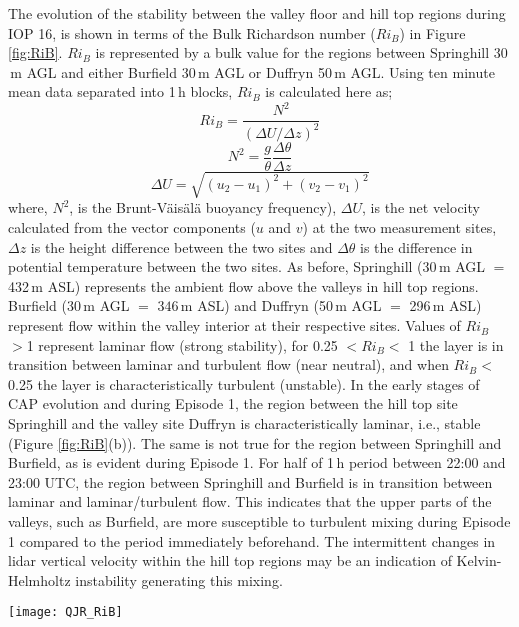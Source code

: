 \documentclass[times]{qjrms4}
\begin{document}
The evolution of the stability between the valley floor and hill top regions during IOP 16, is shown in terms of the Bulk Richardson number ($Ri_B$) in Figure \ref{fig:RiB}. $Ri_B$ is represented by a bulk value for the regions between Springhill 30$\,\mbox{m}$ AGL and either Burfield 30$\,\mbox{m}$ AGL or Duffryn 50$\,\mbox{m}$ AGL. Using ten minute mean data separated into 1$\,\mbox{h}$ blocks, $Ri_B$ is calculated here as;
        \begin{equation}    \label{eq:Rib1}
        Ri_B = \frac{N^2}{(\Delta U/ \Delta z)^2}
        \end{equation}
        \begin{equation}    \label{eq:Nsq}
        N^2 = \frac{g}{\theta}\frac{\Delta\theta}{\Delta z}
        \end{equation}
        \begin{equation}    \label{eq:U}
        \Delta U = \sqrt{(u_2-u_1)^2+(v_2-v_1)^2}
        \end{equation}
\noindent where, $N^2$, is the Brunt-V\"ais\"al\"a buoyancy frequency), $\Delta U$, is the net velocity calculated from the vector components ($u$ and $v$) at the two measurement sites, $\Delta z$ is the height difference between the two sites and $\Delta \theta$ is the difference in potential temperature between the two sites. As before, Springhill (30$\,\mbox{m}$ AGL $=$ 432$\,\mbox{m}$ ASL) represents the ambient flow above the valleys in hill top regions. Burfield (30$\,\mbox{m}$ AGL $=$ $346\,\mbox{m}$ ASL) and Duffryn (50$\,\mbox{m}$ AGL $=$ 296$\,\mbox{m}$ ASL) represent flow within the valley interior at their respective sites. Values of $Ri_B$ $>$1 represent laminar flow (strong stability), for 0.25 $< Ri_B <$ 1 the layer is in transition between laminar and turbulent flow (near neutral), and when $Ri_B <$ 0.25 the layer is characteristically turbulent (unstable). In the early stages of CAP evolution and during Episode 1, the region between the hill top site Springhill and the valley site Duffryn is characteristically laminar, i.e., stable (Figure \ref{fig:RiB}(b)). The same is not true for the region between Springhill and Burfield, as is evident during Episode 1. For half of 1$\,\mbox{h}$ period between 22:00 and 23:00 UTC, the region between Springhill and Burfield is in transition between laminar and laminar/turbulent flow. This indicates that the upper parts of the valleys, such as Burfield, are more susceptible to turbulent mixing during Episode 1 compared to the period immediately beforehand. The intermittent changes in lidar vertical velocity within the hill top regions may be an indication of Kelvin-Helmholtz instability generating this mixing.
       \begin{figure*}
        \centering
        \texttt{[image: QJR\_RiB]}
        \caption{Bulk Richardson number ($Ri_B$) representing the regions between Springhill 30$\,\mbox{m}$ AGL and; (a) Burfield 30$\,\mbox{m}$ AGL, (b) Duffryn 50$\,\mbox{m}$ AGL.}
        \label{fig:RiB}
        \end{figure*}
\end{document}
